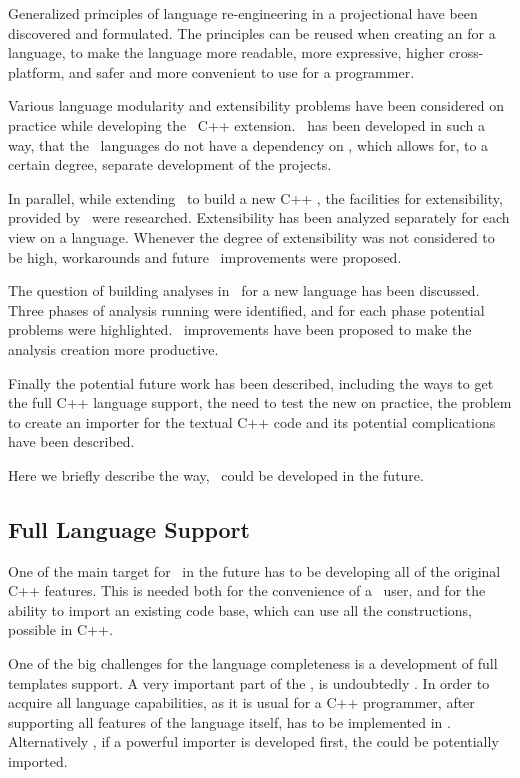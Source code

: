 Generalized principles of language re-engineering in a projectional  have been
discovered and formulated. The principles can be reused when creating an  for 
a language, to make the language more readable, more expressive, higher cross-platform,
and safer and more convenient to use for a programmer. 

Various language modularity and extensibility problems have been considered on 
practice while developing the \mbdr\ C++ extension. \pcpp\ has been developed in 
such a way, that the \mbdp\ languages do not have a dependency on \pcpp, which
allows for, to a certain degree, separate development of the projects.

In parallel,  while extending \mbdr\ to build a new C++ , the facilities 
for extensibility, provided by \jbmps\ were researched. Extensibility has been 
analyzed separately for each view on a language. Whenever the degree of extensibility 
was not considered to be high, workarounds and future \jbmps\ improvements were proposed.

The question of building analyses in \jbmps\ for a new language has been discussed.
Three phases of analysis running were identified, and for each phase potential problems
were highlighted. \jbmps\ improvements have been proposed to make the analysis creation 
more productive.

Finally the potential future work has been described, including the ways to get the full C++ language 
support, the need to test the new  on practice, the problem to create an importer for the
textual C++ code and its potential complications have been described.


Here we briefly describe the way, \pcpp\ could be developed in the future.

\subsection{Full Language Support}

One of the main target for \pcpp\ in the future has to be developing 
all of the original C++ features. This is needed both for the convenience of 
a \pcpp\ user, and for the ability to import an existing code base, which 
can use all the constructions, possible in C++.

One of the big challenges for the language completeness is a development 
of full templates support.
A very important part of the \cpppl, is undoubtedly  . In order to acquire
all language capabilities, as it is usual for a C++ programmer, after supporting all features
of the language itself,  has to be implemented in \pcpp. Alternatively , if a powerful
importer is developed first, the  could be potentially imported. 

